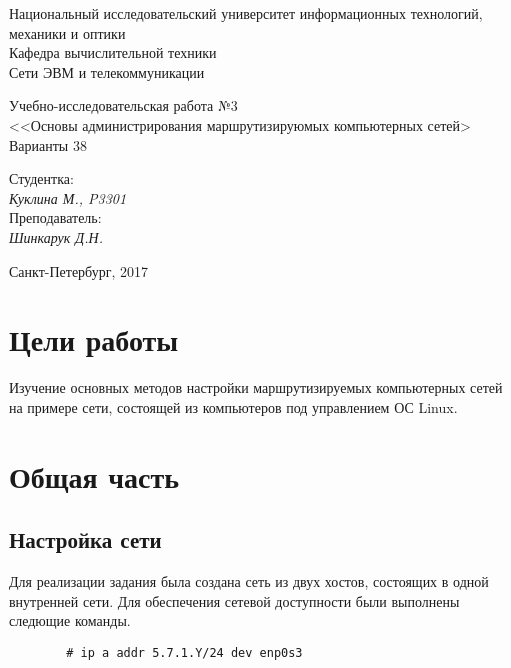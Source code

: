 \documentclass[12pt, a4paper] {ncc}
\begin{document}
\frenchspacing
\pagestyle{empty}
\begin{center}
     Национальный исследовательский университет информационных технологий,
                              механики и оптики\\
                        Кафедра вычислительной техники\\
                          Сети ЭВМ и телекоммуникации
\end{center}
\begin{center}
                            Учебно-исследовательская работа №3\\
                        <<Основы администрирования маршрутизируюмых компьютерных сетей>
								Варианты 38
\end{center}
\begin{flushright}
                                          Студентка:\\
                                                         {\it Куклина М., P3301} \\
										  Преподаватель:\\
														 {\it Шинкарук Д.Н. }
\end{flushright}
\begin{center}
                             Санкт-Петербург, 2017
\end{center}
\newpage


\section*{Цели работы}
	Изучение основных методов настройки маршрутизируемых компьютерных сетей на примере сети,
	состоящей из компьютеров под управлением ОС Linux.

\section*{Общая часть}
	\subsection*{Настройка сети}
    	Для реализации задания была создана сеть из двух хостов, состоящих в одной
    	внутренней сети. Для обеспечения сетевой доступности были выполнены следющие команды.
\begin{verbatim}
        # ip a addr 5.7.1.Y/24 dev enp0s3
\end{verbatim}
\end{document}
